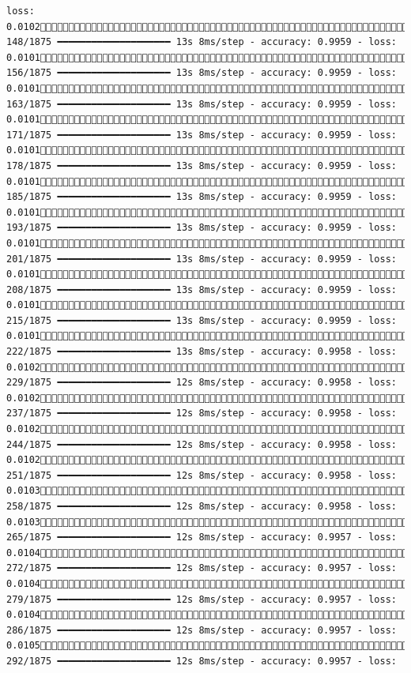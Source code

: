 \documentclass[
  letterpaper,
  DIV=11,
  numbers=noendperiod]{scrreprt}
\begin{document}
\begin{verbatim}
loss: 0.0102 148/1875 ━━━━━━━━━━━━━━━━━━━━ 13s 8ms/step - accuracy: 0.9959 - loss: 0.0101 156/1875 ━━━━━━━━━━━━━━━━━━━━ 13s 8ms/step - accuracy: 0.9959 - loss: 0.0101 163/1875 ━━━━━━━━━━━━━━━━━━━━ 13s 8ms/step - accuracy: 0.9959 - loss: 0.0101 171/1875 ━━━━━━━━━━━━━━━━━━━━ 13s 8ms/step - accuracy: 0.9959 - loss: 0.0101 178/1875 ━━━━━━━━━━━━━━━━━━━━ 13s 8ms/step - accuracy: 0.9959 - loss: 0.0101 185/1875 ━━━━━━━━━━━━━━━━━━━━ 13s 8ms/step - accuracy: 0.9959 - loss: 0.0101 193/1875 ━━━━━━━━━━━━━━━━━━━━ 13s 8ms/step - accuracy: 0.9959 - loss: 0.0101 201/1875 ━━━━━━━━━━━━━━━━━━━━ 13s 8ms/step - accuracy: 0.9959 - loss: 0.0101 208/1875 ━━━━━━━━━━━━━━━━━━━━ 13s 8ms/step - accuracy: 0.9959 - loss: 0.0101 215/1875 ━━━━━━━━━━━━━━━━━━━━ 13s 8ms/step - accuracy: 0.9959 - loss: 0.0101 222/1875 ━━━━━━━━━━━━━━━━━━━━ 13s 8ms/step - accuracy: 0.9958 - loss: 0.0102 229/1875 ━━━━━━━━━━━━━━━━━━━━ 12s 8ms/step - accuracy: 0.9958 - loss: 0.0102 237/1875 ━━━━━━━━━━━━━━━━━━━━ 12s 8ms/step - accuracy: 0.9958 - loss: 0.0102 244/1875 ━━━━━━━━━━━━━━━━━━━━ 12s 8ms/step - accuracy: 0.9958 - loss: 0.0102 251/1875 ━━━━━━━━━━━━━━━━━━━━ 12s 8ms/step - accuracy: 0.9958 - loss: 0.0103 258/1875 ━━━━━━━━━━━━━━━━━━━━ 12s 8ms/step - accuracy: 0.9958 - loss: 0.0103 265/1875 ━━━━━━━━━━━━━━━━━━━━ 12s 8ms/step - accuracy: 0.9957 - loss: 0.0104 272/1875 ━━━━━━━━━━━━━━━━━━━━ 12s 8ms/step - accuracy: 0.9957 - loss: 0.0104 279/1875 ━━━━━━━━━━━━━━━━━━━━ 12s 8ms/step - accuracy: 0.9957 - loss: 0.0104 286/1875 ━━━━━━━━━━━━━━━━━━━━ 12s 8ms/step - accuracy: 0.9957 - loss: 0.0105 292/1875 ━━━━━━━━━━━━━━━━━━━━ 12s 8ms/step - accuracy: 0.9957 - loss: 
\end{verbatim}
\end{document}
